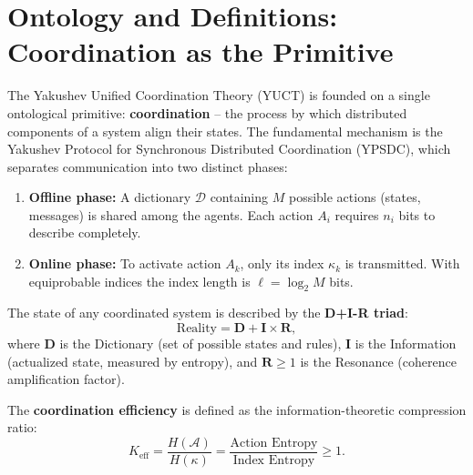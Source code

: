 \documentclass[12pt,a4paper]{article}
\newcommand{\Keff}{K_{\mathrm{eff}}}
\begin{document}
	\vspace{0.4cm}
	
	\section{Ontology and Definitions: Coordination as the Primitive}
	\label{sec:ontology}
	
	The Yakushev Unified Coordination Theory (YUCT) is founded on a single ontological primitive: \textbf{coordination} -- the process by which distributed components of a system align their states. The fundamental mechanism is the Yakushev Protocol for Synchronous Distributed Coordination (YPSDC), which separates communication into two distinct phases:
	\begin{enumerate}
		\item \textbf{Offline phase:} A dictionary \(\mathcal{D}\) containing \(M\) possible actions (states, messages) is shared among the agents. Each action \(A_i\) requires \(n_i\) bits to describe completely.
		\item \textbf{Online phase:} To activate action \(A_k\), only its index \(\kappa_k\) is transmitted. With equiprobable indices the index length is \(\ell = \log_2 M\) bits.
	\end{enumerate}
	
	The state of any coordinated system is described by the \textbf{D+I-R triad}:
	\[
	\text{Reality} = \mathbf{D} + \mathbf{I} \times \mathbf{R},
	\]
	where \(\mathbf{D}\) is the Dictionary (set of possible states and rules), \(\mathbf{I}\) is the Information (actualized state, measured by entropy), and \(\mathbf{R} \ge 1\) is the Resonance (coherence amplification factor).
	
	The \textbf{coordination efficiency} is defined as the information-theoretic compression ratio:
	\begin{equation}
		\Keff = \frac{H(\mathcal{A})}{H(\kappa)} = \frac{\text{Action Entropy}}{\text{Index Entropy}} \ge 1.
		\label{eq:keff-def}
	\end{equation}
	
	\begin{center}
	\end{center}
	
\end{document}
